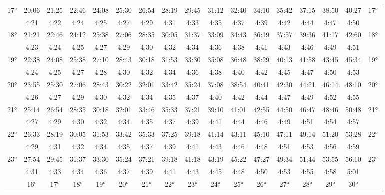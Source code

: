 \begin{scriptsize}
\begin{tabular}{c || c | c | c | c | c | c | c | c | c | c | c | c | c | c | c || c}
		\multirow{2}{*}{17°}&20:06&21:25&22:46&24:08&25:30&26:54&28:19&29:45&31:12&32:40&34:10&35:42&37:15&38:50&40:27&\multirow{2}{*}{17°}\\ \space&4:21&4:22&4:24&4:25&4:27&4:29&4:31&4:33&4:35&4:37&4:39&4:42&4:44&4:47&4:50&\space\\\hline
		\multirow{2}{*}{18°}&21:21&22:46&24:12&25:38&27:06&28:35&30:05&31:37&33:09&34:43&36:19&37:57&39:36&41:17&42:60&\multirow{2}{*}{18°}\\ \space&4:23&4:24&4:25&4:27&4:29&4:30&4:32&4:34&4:36&4:38&4:41&4:43&4:46&4:49&4:51&\space\\\hline
		\multirow{2}{*}{19°}&22:38&24:08&25:38&27:10&28:43&30:18&31:53&33:30&35:08&36:48&38:29&40:13&41:58&43:45&45:34&\multirow{2}{*}{19°}\\ \space&4:24&4:25&4:27&4:28&4:30&4:32&4:34&4:36&4:38&4:40&4:42&4:45&4:47&4:50&4:53&\space\\\hline
		\multirow{2}{*}{20°}&23:55&25:30&27:06&28:43&30:22&32:01&33:42&35:24&37:08&38:54&40:41&42:30&44:21&46:14&48:10&\multirow{2}{*}{20°}\\ \space&4:26&4:27&4:29&4:30&4:32&4:34&4:35&4:37&4:40&4:42&4:44&4:47&4:49&4:52&4:55&\space\\\hline
		\multirow{2}{*}{21°}&25:14&26:54&28:35&30:18&32:01&33:46&35:33&37:21&39:10&41:01&42:55&44:50&46:47&48:46&50:48&\multirow{2}{*}{21°}\\ \space&4:27&4:29&4:30&4:32&4:34&4:35&4:37&4:39&4:41&4:44&4:46&4:49&4:51&4:54&4:57&\space\\\hline
		\multirow{2}{*}{22°}&26:33&28:19&30:05&31:53&33:42&35:33&37:25&39:18&41:14&43:11&45:10&47:11&49:14&51:20&53:28&\multirow{2}{*}{22°}\\ \space&4:29&4:31&4:32&4:34&4:35&4:37&4:39&4:41&4:43&4:46&4:48&4:51&4:53&4:56&4:59&\space\\\hline
		\multirow{2}{*}{23°}&27:54&29:45&31:37&33:30&35:24&37:21&39:18&41:18&43:19&45:22&47:27&49:34&51:44&53:55&56:10&\multirow{2}{*}{23°}\\ \space&4:31&4:33&4:34&4:36&4:37&4:39&4:41&4:43&4:45&4:48&4:50&4:53&4:55&4:58&5:01&\space\\\hline
		\hline\space &16°&17°&18°&19°&20°&21°&22°&23°&24°&25°&26°&27°&28°&29°&30°
\end{tabular}\end{scriptsize}

